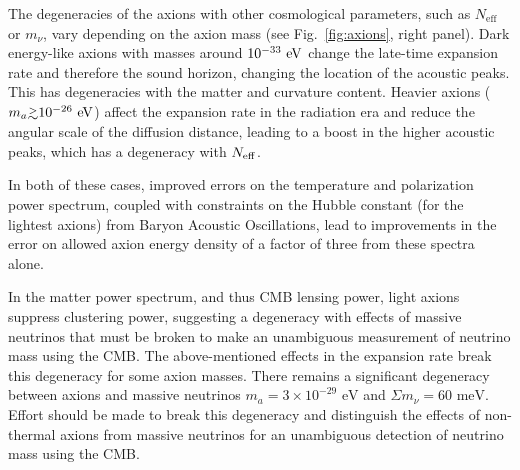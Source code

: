 The degeneracies of the axions with other cosmological parameters, such as $N_\mathrm{eff}$ or $m_\nu$, vary depending on the axion mass (see Fig.~\ref{fig:axions}, right panel). Dark energy-like axions with masses around $10^{-33}~{\rm eV}$ change the late-time expansion rate and therefore the sound horizon, changing the location of the acoustic peaks. This has degeneracies with the matter and curvature content. 
Heavier axions ($m_a \gtrsim 10^{-26}~{\rm eV}$) affect the expansion rate in the radiation era and reduce the angular scale of the diffusion distance, leading to a boost in the higher acoustic peaks, which has a degeneracy with $N_{\rm eff}$. 

In both of these cases, improved errors on the temperature and polarization power spectrum, coupled with constraints on the Hubble constant (for the lightest axions) from Baryon Acoustic Oscillations, lead to improvements in the error on allowed axion energy density of a factor of three from these spectra alone. 

In the matter power spectrum, and thus CMB lensing power, light axions suppress clustering power, suggesting a degeneracy with effects of massive neutrinos that must be broken to make an unambiguous measurement of neutrino mass using the CMB. The above-mentioned effects in the expansion rate break this degeneracy for some axion masses. There remains a significant degeneracy between axions and massive neutrinos $m_a=3\times 10^{-29}\text{ eV}$ and $\Sigma m_\nu=60\text{ meV}$. Effort should be made to break this degeneracy and distinguish the effects of non-thermal axions from massive neutrinos for an unambiguous detection of neutrino mass using the CMB. 


